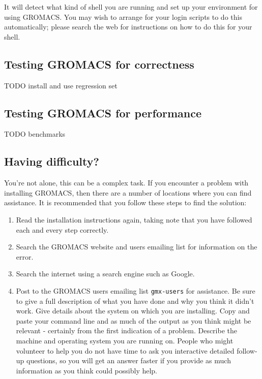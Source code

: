 \documentclass{article}[12pt,a4paper,twoside]
\newcommand{\gromacs}{GROMACS}
\begin{document}
It will detect what kind of shell you are running and
set up your environment for using \gromacs{}. You may wish to arrange
for your login scripts to do this automatically; please search the web
for instructions on how to do this for your shell.

\subsection{Testing \gromacs{} for correctness}
TODO install and use regression set

\subsection{Testing \gromacs{} for performance}
TODO benchmarks

\subsection{Having difficulty?}

You're not alone, this can be a complex task. If you encounter a
problem with installing \gromacs{}, then there are a number of
locations where you can find assistance. It is recommended that you
follow these steps to find the solution:

\begin{enumerate}
\item Read the installation instructions again, taking note that you
  have followed each and every step correctly.
\item Search the \gromacs{} website and users emailing list for
  information on the error.
\item Search the internet using a search engine such as Google.
\item Post to the \gromacs{} users emailing list \texttt{gmx-users}
  for assistance. Be sure to give a full description of what you have
  done and why you think it didn't work. Give details about the system
  on which you are installing. Copy and paste your command line and as
  much of the output as you think might be relevant - certainly from
  the first indication of a problem. Describe the machine and
  operating system you are running on. People who might volunteer to
  help you do not have time to ask you interactive detailed follow-up
  questions, so you will get an answer faster if you provide as much
  information as you think could possibly help.
\end{enumerate}
\end{document}
